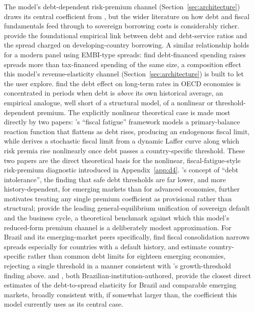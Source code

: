 \documentclass[11pt,a4paper]{article}
\begin{document}
The model's debt-dependent risk-premium channel (Section~\ref{sec:architecture}) draws its central coefficient from \citet{baldaccikumar2010}, but the wider literature on how debt and fiscal fundamentals feed through to sovereign borrowing costs is considerably richer. \citet{edwards1984,edwards1986} provide the foundational empirical link between debt and debt-service ratios and the spread charged on developing-country borrowing. A similar relationship holds for a modern panel using EMBI-type spreads: \citet{akitobystratmann2008} find debt-financed spending raises spreads more than tax-financed spending of the same size, a composition effect this model's revenue-elasticity channel (Section~\ref{sec:architecture}) is built to let the user explore. \citet{ardagnacasellilane2007} find the debt effect on long-term rates in OECD economies is concentrated in periods when debt is \emph{above} its own historical average, an empirical analogue, well short of a structural model, of a nonlinear or threshold-dependent premium. The explicitly nonlinear theoretical case is made most directly by two papers: \citet{ghoshkimmendozaostryqureshi2013}'s ``fiscal fatigue'' framework models a primary-balance reaction function that flattens as debt rises, producing an endogenous fiscal limit, while \citet{bi2012} derives a stochastic fiscal limit from a dynamic Laffer curve along which risk premia rise nonlinearly once debt passes a country-specific threshold. These two papers are the direct theoretical basis for the nonlinear, fiscal-fatigue-style risk-premium diagnostic introduced in Appendix~\ref{app:d4}. \citet{reinhartrogoffsavastano2003}'s concept of ``debt intolerance'', the finding that safe debt thresholds are far lower, and more history-dependent, for emerging markets than for advanced economies, further motivates treating any single premium coefficient as provisional rather than structural; \citet{mendozayue2012} provide the leading general-equilibrium unification of sovereign default and the business cycle, a theoretical benchmark against which this model's reduced-form premium channel is a deliberately modest approximation. For Brazil and its emerging-market peers specifically, \citet{guptamatibaldacci2008} find fiscal consolidation narrows spreads especially for countries with a default history, and \citet{camposcysne2021} estimate country-specific rather than common debt limits for eighteen emerging economies, rejecting a single threshold in a manner consistent with \citet{egert2015}'s growth-threshold finding above. \citet{ornelas2017} and \citet{rochamoreira2012}, both Brazilian-institution-authored, provide the closest direct estimates of the debt-to-spread elasticity for Brazil and comparable emerging markets, broadly consistent with, if somewhat larger than, the \citet{baldaccikumar2010} coefficient this model currently uses as its central case.
\end{document}
